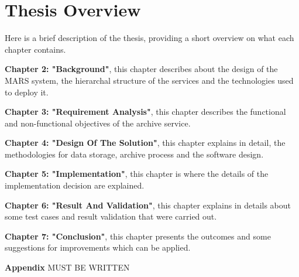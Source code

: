     \newpage
    \section{Thesis Overview} 
        Here is a brief description of the thesis, providing a short overview on what each
        chapter contains.
        
        \par
        \textbf{Chapter 2: "Background"}, this chapter describes about the design
        of the MARS system, the hierarchal structure of the services and the technologies used to
        deploy it.

        \par
        \textbf{Chapter 3: "Requirement Analysis"}, this chapter describes the functional and
        non-functional objectives of the archive service.

        \par
        \textbf{Chapter 4: "Design Of The Solution"}, this chapter explains in detail, the 
        methodologies for data storage, archive process and the software design.

        \par
        \textbf{Chapter 5: "Implementation"}, this chapter is where the details of the 
        implementation decision are explained.

        \par
        \textbf{Chapter 6: "Result And Validation"}, this chapter explains in details about 
        some test cases and result validation that were carried out.

        \par
        \textbf{Chapter 7: "Conclusion"}, this chapter presents the outcomes and some 
        suggestions for improvements which can be applied.
        
        \par
        \textbf{Appendix}
        MUST BE WRITTEN


